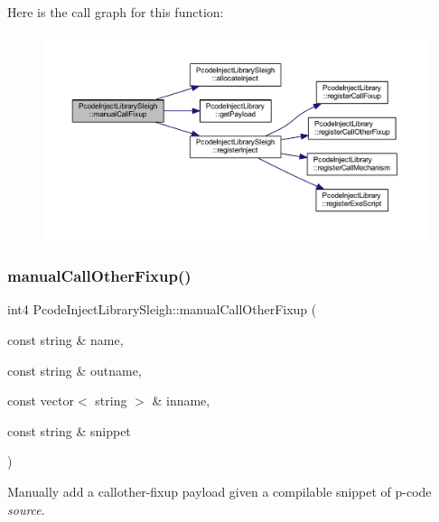 Here is the call graph for this function\+:
\nopagebreak
\begin{figure}[H]
\begin{center}
\leavevmode
\includegraphics[width=350pt]{class_pcode_inject_library_sleigh_a4cce009469fb3679881ea73bc2ed9284_cgraph}
\end{center}
\end{figure}
\mbox{\label{class_pcode_inject_library_sleigh_a5effe6ebe2d5b20644c2066d427283ae}} 
\subsubsection{\texorpdfstring{manualCallOtherFixup()}{manualCallOtherFixup()}}
{\footnotesize\ttfamily int4 Pcode\+Inject\+Library\+Sleigh\+::manual\+Call\+Other\+Fixup (\begin{DoxyParamCaption}\item[{const string \&}]{name,  }\item[{const string \&}]{outname,  }\item[{const vector$<$ string $>$ \&}]{inname,  }\item[{const string \&}]{snippet }\end{DoxyParamCaption})\hspace{0.3cm}{\ttfamily [virtual]}}



Manually add a callother-\/fixup payload given a compilable snippet of p-\/code {\itshape source}. 

